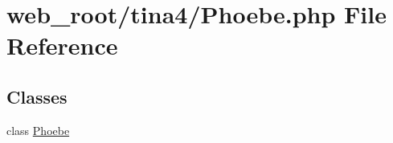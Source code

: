 \hypertarget{Phoebe_8php}{}\section{web\+\_\+root/tina4/\+Phoebe.php File Reference}
\label{Phoebe_8php}
\subsection*{Classes}
\begin{DoxyCompactItemize}
\item 
class \hyperlink{classPhoebe}{Phoebe}
\end{DoxyCompactItemize}
